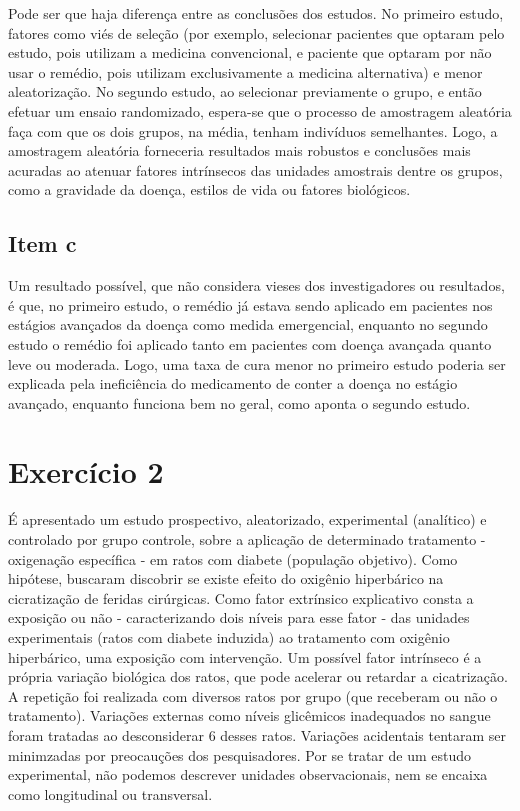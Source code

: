 \documentclass[
  portuguese,
  letterpaper,
  DIV=11,
  numbers=noendperiod]{scrarticle}
\begin{document}
Pode ser que haja diferença entre as conclusões dos estudos. No primeiro
estudo, fatores como viés de seleção (por exemplo, selecionar pacientes
que optaram pelo estudo, pois utilizam a medicina convencional, e
paciente que optaram por não usar o remédio, pois utilizam
exclusivamente a medicina alternativa) e menor aleatorização. No segundo
estudo, ao selecionar previamente o grupo, e então efetuar um ensaio
randomizado, espera-se que o processo de amostragem aleatória faça com
que os dois grupos, na média, tenham indivíduos semelhantes. Logo, a
amostragem aleatória forneceria resultados mais robustos e conclusões
mais acuradas ao atenuar fatores intrínsecos das unidades amostrais
dentre os grupos, como a gravidade da doença, estilos de vida ou fatores
biológicos.

\subsection{Item c}\label{item-c}

Um resultado possível, que não considera vieses dos investigadores ou
resultados, é que, no primeiro estudo, o remédio já estava sendo
aplicado em pacientes nos estágios avançados da doença como medida
emergencial, enquanto no segundo estudo o remédio foi aplicado tanto em
pacientes com doença avançada quanto leve ou moderada. Logo, uma taxa de
cura menor no primeiro estudo poderia ser explicada pela ineficiência do
medicamento de conter a doença no estágio avançado, enquanto funciona
bem no geral, como aponta o segundo estudo.

\section{Exercício 2}\label{exercuxedcio-2}

É apresentado um estudo prospectivo, aleatorizado, experimental
(analítico) e controlado por grupo controle, sobre a aplicação de
determinado tratamento - oxigenação específica - em ratos com diabete
(população objetivo). Como hipótese, buscaram discobrir se existe efeito
do oxigênio hiperbárico na cicratização de feridas cirúrgicas. Como
fator extrínsico explicativo consta a exposição ou não - caracterizando
dois níveis para esse fator - das unidades experimentais (ratos com
diabete induzida) ao tratamento com oxigênio hiperbárico, uma exposição
com intervenção. Um possível fator intrínseco é a própria variação
biológica dos ratos, que pode acelerar ou retardar a cicatrização. A
repetição foi realizada com diversos ratos por grupo (que receberam ou
não o tratamento). Variações externas como níveis glicêmicos inadequados
no sangue foram tratadas ao desconsiderar \(6\) desses ratos. Variações
acidentais tentaram ser minimzadas por preocauções dos pesquisadores.
Por se tratar de um estudo experimental, não podemos descrever unidades
observacionais, nem se encaixa como longitudinal ou transversal.
\end{document}

